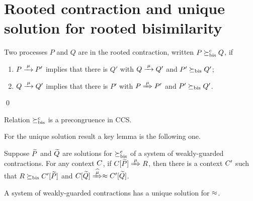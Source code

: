 \section{Rooted contraction and unique solution for rooted bisimilarity}
\label{ss:new}
             



\begin{definition}
\label{d:rcontra}
Two processes $P$ and $Q$ are in the rooted contraction, written 
 $P\mathrel{\succeq^{\rm{c}}_{\rm{bis}}} Q$, 
if 

\begin{enumerate}

\item   $P \arr\mu P'$ implies that there is $Q'$ with $Q \arr \mu
  Q'$
 and $P'\mathrel{\succeq_{\rm{bis}}} Q'$;

\item 
    $Q \arr\mu Q'$   implies that there is $P'$ with $P \Arr \mu
 P'$ and $P' 
\mathrel{\succeq_{\rm{bis}}} Q'$.


\end{enumerate}
\qed\end{definition}




\begin{theorem}
\label{t:}
Relation $\mathrel{\succeq^{\rm{c}}_{\rm{bis}}}$ is a precongruence in CCS. 
\end{theorem}  


For the unique solution result a key lemma is the following one. 

\begin{lemma}
\label{l:uptocon}
Suppose $\widetilde P$ and $\widetilde Q$ are solutions  for $\mathrel{\succeq^{\rm{c}}_{\rm{bis}}}$ 
 of a system of weakly-guarded
contractions.
For any context $C$, 
if  $\ct{\til P}\Arr{\mu}  R$,
 then 
there is a  context $C'$
such that $R \mathrel{\succeq_{\rm{bis}}} C' [\widetilde P]$ and  $\ct{\til Q} \Arcap{\mu}
 \wb \ctp{\til Q}$.
\end{lemma}

\begin{theorem}
\label{t:contra_bisimulation_u}
A system of weakly-guarded contractions
    has 
a unique solution 
 for $\approx$.
\end{theorem} 


